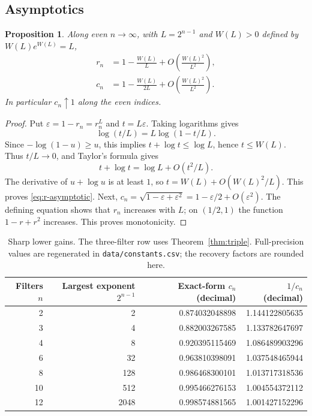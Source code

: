 \documentclass[11pt,a4paper]{article}
\newtheorem{proposition}[theorem]{Proposition}
\theoremstyle{definition}\newtheorem{definition}[theorem]{Definition}
\theoremstyle{remark}\newtheorem{remark}[theorem]{Remark}
\begin{document}
\subsection{Asymptotics}
\begin{proposition}\label{prop:asymptotic}
Along even $n\to\infty$, with $L=2^{n-1}$ and $W(L)>0$ defined by $W(L)e^{W(L)}=L$,
\begin{align}
r_n&=1-\frac{W(L)}L+O\left(\frac{W(L)^2}{L^2}\right),\label{eq:r-asymptotic}\\
c_n&=1-\frac{W(L)}{2L}+O\left(\frac{W(L)^2}{L^2}\right).
\end{align}
In particular $c_n\uparrow1$ along the even indices.
\end{proposition}
\begin{proof}
Put $\varepsilon=1-r_n=r_n^L$ and $t=L\varepsilon$. Taking logarithms gives
\[
\log(t/L)=L\log(1-t/L).
\]
Since $-\log(1-u)\ge u$, this implies $t+\log t\le\log L$, hence $t\le W(L)$. Thus $t/L\to0$, and Taylor's formula gives
\[
t+\log t=\log L+O(t^2/L).
\]
The derivative of $u+\log u$ is at least $1$, so
$t=W(L)+O(W(L)^2/L)$. This proves \eqref{eq:r-asymptotic}. Next,
$c_n=\sqrt{1-\varepsilon+\varepsilon^2}=1-\varepsilon/2+O(\varepsilon^2)$.
The defining equation shows that $r_n$ increases with $L$; on $(1/2,1)$ the function $1-r+r^2$ increases. This proves monotonicity.
\end{proof}

\begin{table}[ht]
\centering
\begin{tabular}{rrrr}
\toprule
Filters $n$ & Largest exponent $2^{n-1}$ & Exact-form $c_n$ (decimal) & $1/c_n$ (decimal)\\
\midrule
2 & 2 & 0.874032048898 & 1.144122805635\\
3 & 4 & 0.882003267585 & 1.133782647697\\
4 & 8 & 0.920395115469 & 1.086489903296\\
6 & 32 & 0.963810398091 & 1.037548465944\\
8 & 128 & 0.986468300101 & 1.013717318536\\
10 & 512 & 0.995466276153 & 1.004554372112\\
12 & 2048 & 0.998574881565 & 1.001427152296\\
\bottomrule
\end{tabular}
\caption{Sharp lower gains. The three-filter row uses Theorem~\ref{thm:triple}. Full-precision values are regenerated in \texttt{data/constants.csv}; the recovery factors are rounded here.}
\label{tab:constants}
\end{table}
\end{document}

